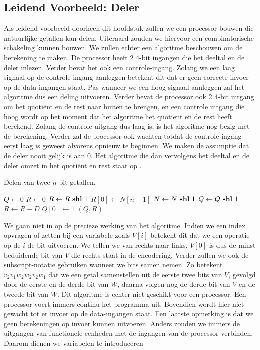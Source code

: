 \subsection{Leidend Voorbeeld: Deler}
Als leidend voorbeeld doorheen dit hoofdstuk zullen we een processor bouwen die natuurlijke getallen kan delen. Uiteraard zouden we hiervoor een combinatorische schakeling kunnen bouwen. We zullen echter een algoritme beschouwen om de berekening te maken. De processor heeft 2 4-bit ingangen die het deeltal en de deler inlezen. Verder bevat het ook een controle-ingang. Zolang we een laag signaal op de controle-ingang aanleggen betekent dit dat er geen correcte invoer op de data-ingangen staat. Pas wanneer we een hoog signaal aanleggen zal het algoritme dus een deling uitvoeren. Verder bevat de processor ook 2 4-bit uitgang om het quoti\"ent en de rest naar buiten te brengen, en een controle uitgang die hoog wordt op het moment dat het algoritme het quoti\"ent en de rest heeft berekend. Zolang de controle-uitgang dus laag is, is het algoritme nog bezig met de berekening. Verder zal de processor ook wachten totdat de controle-ingang eerst laag is geweest alvorens opnieuw te beginnen. We maken de assumptie dat
de deler nooit gelijk is aan 0. Het algoritme die dan vervolgens het deeltal en de deler omzet in het quoti\"ent en rest staat op .
\begin{algorithm}[hbt]
\caption{Delen van twee $n$-bit getallen.}\label{alg:devisionFSMD}
\begin{algorithmic}[1]
\State $Q\gets 0$
\State $R\gets 0$
\State $R\gets R\mbox{ \textbf{shl} }{}1$
\State $R\left[0\right]\gets N\left[n-1\right]$
\State $N\gets N\mbox{ \textbf{shl} }{}1$
\State $Q\gets Q\mbox{ \textbf{shl} }{}1$
\State $R\gets R-D$
\State $Q\left[0\right]\gets 1$
\EndIf
\EndFor
\State \Return $\left(Q,R\right)$
\EndFunction
\end{algorithmic}
\end{algorithm}
We gaan niet in op de precieze werking van het algoritme. Indien we een index opvragen of zetten bij een variabele zoals $V\left[i\right]$ betekent dit dat we een operatie op de $i$-de bit uitvoeren. We tellen we van rechts naar links, $V[0]$ is dus de minst beduidende bit van $V$ die rechts staat in de encodering. Verder zullen we ook de subscript-notatie gebruiken wanneer we bits samen nemen. Zo betekent $v_2v_1w_2w_2v_2w_1$ dat we een getal samenstellen uit de eerste twee bits van $V$, gevolgd door de eerste en de derde bit van $W$, daarna volgen nog de derde bit van $V$ en de tweede bit van $W$. Dit algoritme is echter niet geschikt voor een processor. Een processor voert immers continu het programma uit. Bovendien wordt hier niet gewacht tot er invoer op de data-ingangen staat. Een laatste opmerking is dat we geen berekeningen op invoer kunnen uitvoeren. Anders zouden we immers de uitgangen van functionele eenheden met de ingangen van de processor verbinden. Daarom dienen we variabelen te introduceren
